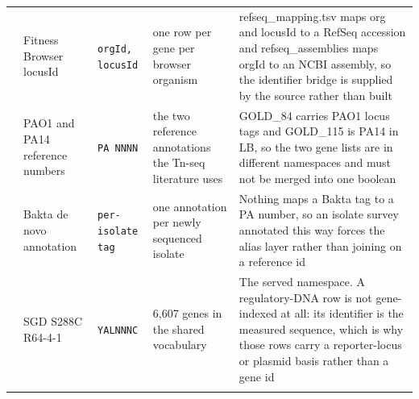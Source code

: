 \begin{longtable}{@{}L{22mm} L{34mm} L{20mm} L{30mm} L{66mm}@{}}
\addlinespace[5pt]
 & Fitness Browser locusId & \texttt{orgId, locusId} & one row per gene per browser organism & refseq\_mapping.tsv maps org and locusId to a RefSeq accession and refseq\_assemblies maps orgId to an NCBI assembly, so the identifier bridge is supplied by the source rather than built \\
\addlinespace[5pt]
 & PAO1 and PA14 reference numbers & \texttt{PA NNNN} & the two reference annotations the Tn-seq literature uses & GOLD\_84 carries PAO1 locus tags and GOLD\_115 is PA14 in LB, so the two gene lists are in different namespaces and must not be merged into one boolean \\
\addlinespace[5pt]
 & Bakta de novo annotation & \texttt{per-isolate tag} & one annotation per newly sequenced isolate & Nothing maps a Bakta tag to a PA number, so an isolate survey annotated this way forces the alias layer rather than joining on a reference id \\
\addlinespace[5pt]
 & SGD S288C R64-4-1 & \texttt{YALNNNC} & 6,607 genes in the shared vocabulary & The served namespace. A regulatory-DNA row is not gene-indexed at all: its identifier is the measured sequence, which is why those rows carry a reporter-locus or plasmid basis rather than a gene id \\
\addlinespace[5pt]
\end{longtable}
\endgroup
